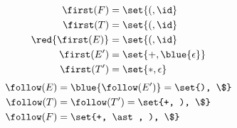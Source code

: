 \begin{frame}{}
  \begin{center}
    

  \end{center}
\end{frame}

\begin{frame}{}
  \begin{center}
    \begin{columns}
        
    \end{columns}

    \begin{columns}
        \begin{align*}
          \first(F) &= \set{(, \id} \\
          \first(T) &= \set{(, \id} \\
          \red{\first(E)} &= \set{(, \id} \\
          \first(E') &= \set{+, \blue{\epsilon}} \\
          \first(T') &= \set{\ast, \epsilon}
        \end{align*}
        \begin{align*}
          \follow(E) &= \blue{\follow(E')} = \set{), \$} \\
          \follow(T) &= \follow(T') = \set{+, ), \$} \\
          \follow(F) &= \set{+, \ast, ), \$}
        \end{align*}
    \end{columns}
  \end{center}
\end{frame}

\begin{frame}{}
  \begin{center}

  \end{center}
\end{frame}
